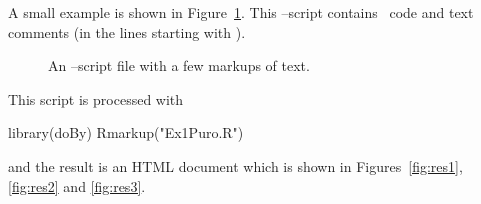 \documentclass[11pt]{article}
\begin{document}
A small example is shown in Figure~\ref{fig:src1}. This \R--script
contains \R\ code and text comments (in the lines starting with
\code{\#\#}).



\begin{figure}[ht]
  \centering
  \caption{An \R--script file with a few markups of text.}
  \label{fig:src1}
\end{figure}

This script is processed with
\begin{Schunk}
\begin{Sinput}
 library(doBy)
 Rmarkup("Ex1Puro.R")
\end{Sinput}
\end{Schunk}
and the result is an
HTML document which is shown in Figures~\ref{fig:res1}, \ref{fig:res2}
and \ref{fig:res3}.
\end{document}
